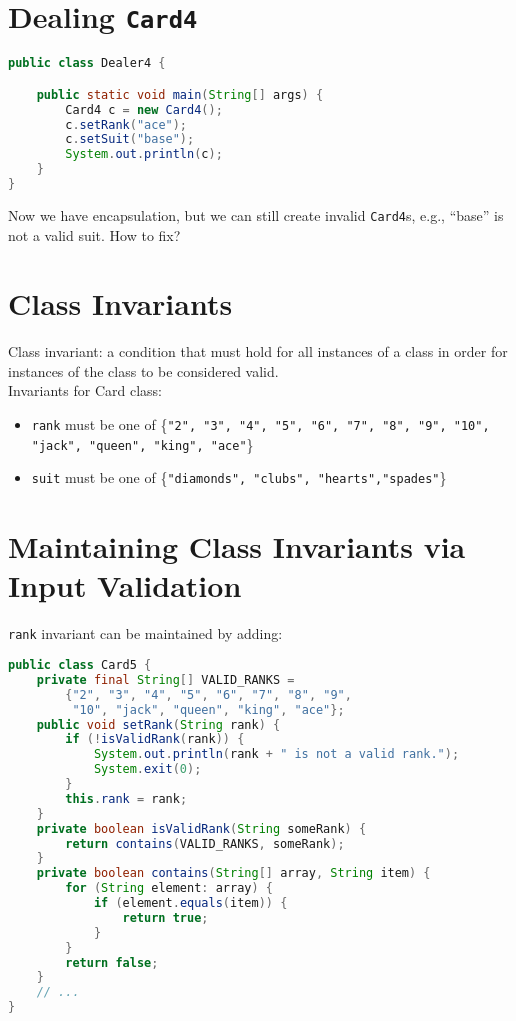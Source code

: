 \documentclass{article}
\begin{document}
\section{Dealing {\tt Card4}}


\begin{lstlisting}[language=Java]
public class Dealer4 {

    public static void main(String[] args) {
        Card4 c = new Card4();
        c.setRank("ace");
        c.setSuit("base");
        System.out.println(c);
    }
}
\end{lstlisting}

Now we have encapsulation, but we can still create invalid {\tt Card4}s, e.g., ``base'' is not a valid suit.  How to fix?





\section{Class Invariants}


Class invariant: a condition that must hold for all instances of a class in order for instances of the class to be considered valid.\\

Invariants for Card class:
\begin{itemize}
\item {\tt rank} must be one of \{{\tt "2", "3", "4", "5", "6", "7", "8", "9",
         "10", "jack", "queen", "king", "ace"}\}
\item {\tt suit} must be one of \{{\tt "diamonds", "clubs", "hearts","spades"}\}
\end{itemize}






\section{Maintaining Class Invariants via Input Validation}



{\tt rank} invariant can be maintained by adding:

\begin{lstlisting}[language=Java]
public class Card5 {
    private final String[] VALID_RANKS =
        {"2", "3", "4", "5", "6", "7", "8", "9",
         "10", "jack", "queen", "king", "ace"};
    public void setRank(String rank) {
        if (!isValidRank(rank)) {
            System.out.println(rank + " is not a valid rank.");
            System.exit(0);
        }
        this.rank = rank;
    }
    private boolean isValidRank(String someRank) {
        return contains(VALID_RANKS, someRank);
    }
    private boolean contains(String[] array, String item) {
        for (String element: array) {
            if (element.equals(item)) {
                return true;
            }
        }
        return false;
    }
    // ...
}
\end{lstlisting}
\end{document}
